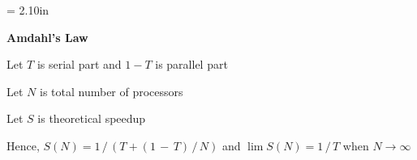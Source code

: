 \documentclass[a4paper,12pt]{article}
\begin{document}
\newpage\thispagestyle{empty}\pdfpageheight = 2.10in\enlargethispage{100in}

\textbf{Amdahl's Law}

\bigskip

Let $T$ is serial part and $1 - T$ is parallel part

\bigskip

Let $N$ is total number of processors

\bigskip

Let $S$ is theoretical speedup

\bigskip

Hence, $S(N) = 1\,/\,(T + (1\,-\,T)\,/\,N)$ and $\lim{S(N)} = 1\,/\,T$ when $N \rightarrow \infty$
\end{document}
